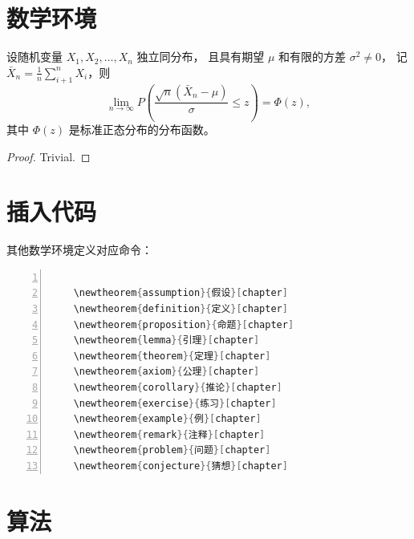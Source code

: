 \documentclass{cqupt_thesis}
\begin{document}
    \section{数学环境}
    \begin{theorem}
        设随机变量 $X_1, X_2, \dots, X_n$ 独立同分布， 且具有期望 $\mu$ 和有限的方差 $\sigma^2 \ne 0$，
        记 $\bar{X}_n = \frac{1}{n} \sum_{i+1}^n X_i$，则
        \begin{equation}
            \lim_{n \to \infty} P \left(\frac{\sqrt{n} \left( \bar{X}_n - \mu \right)}{\sigma} \le z \right) = \Phi(z),
        \end{equation}
        其中 $\Phi(z)$ 是标准正态分布的分布函数。
    \end{theorem}
    \begin{proof}
        Trivial.
    \end{proof}


    \section{插入代码}
    其他数学环境定义对应命令：
    \begin{lstlisting}[language = java, numbers=left,
    numberstyle=\tiny,keywordstyle=\color{blue!70},
    commentstyle=\color{red!50!green!50!blue!50},frame=shadowbox,
    rulesepcolor=\color{red!20!green!20!blue!20},basicstyle=\ttfamily]

	\newtheorem{assumption}{假设}[chapter]
    \newtheorem{definition}{定义}[chapter]
    \newtheorem{proposition}{命题}[chapter]
    \newtheorem{lemma}{引理}[chapter]
    \newtheorem{theorem}{定理}[chapter]
    \newtheorem{axiom}{公理}[chapter]
    \newtheorem{corollary}{推论}[chapter]
    \newtheorem{exercise}{练习}[chapter]
    \newtheorem{example}{例}[chapter]
    \newtheorem{remark}{注释}[chapter]
    \newtheorem{problem}{问题}[chapter]
    \newtheorem{conjecture}{猜想}[chapter]

    \end{lstlisting}


    \section{算法}
\end{document}
